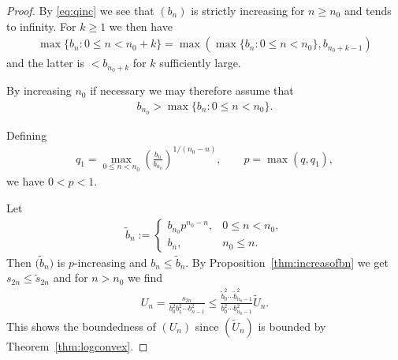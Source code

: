 \begin{proof} By \eqref{eq:qinc} we see that $(b_n)$ is strictly increasing for $n\ge n_0$ and tends to infinity. For $k\ge 1$ we then have
\begin{gather*}
\max\{b_n\colon 0\le n<n_0+k\}=\max\left(\max\{b_n\colon 0\le n<n_0\}, b_{n_0+k-1}\right)
\end{gather*}
and the latter is $<b_{n_0+k}$ for $k$ sufficiently large.

By increasing $n_0$ if necessary we may therefore assume that
\begin{gather*}
b_{n_0}> \max\{b_n\colon 0\le n<n_0\}.
\end{gather*}

Defining
\begin{gather*}
q_1=\max_{0\le n<n_0} \left(\frac{b_n}{b_{n_0}}\right)^{1/(n_0-n)}, \qquad p=\max(q,q_1),
\end{gather*}
we have $0<p<1$.

Let
\begin{gather*}
\tilde{b}_n:=\begin{cases} b_{n_0}p^{n_0-n}, & 0\le n<n_0,\\
b_n, & n_0\le n.
\end{cases}
\end{gather*}
Then $\big(\tilde{b}_n\big)$ is $p$-increasing and $b_n\le\tilde{b}_n$. By Proposition~\ref{thm:increasofbn} we get $s_{2n}\le\tilde{s}_{2n}$ and for $n >n_0$ we find
\begin{gather*}
U_n=\frac{s_{2n}}{b_0^2b_1^2\cdots b_{n-1}^2}\le \frac{\tilde{b}_0^2\cdots \tilde{b}_{n_0-1}^2}{b_0^2\cdots b_{n_0-1}^2} \tilde{U}_n.
\end{gather*}
This shows the boundedness of $(U_n)$ since $(\tilde{U}_n)$ is bounded by Theorem~\ref{thm:logconvex}.
\end{proof}
